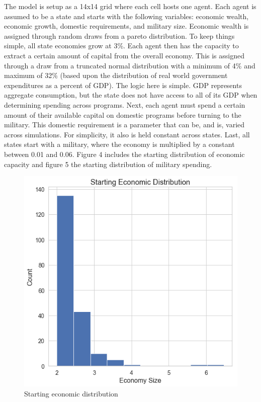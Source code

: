 \documentclass[12pt]{article}
\begin{document}
The model is setup as a 14x14 grid where each cell hosts one agent. Each agent is assumed to be a state and starts with the following variables: economic wealth, economic growth, domestic requirements, and military size. Economic wealth is assigned through random draws from a pareto distribution. To keep things simple, all state economies grow at 3\%. Each agent then has the capacity to extract a certain amount of capital from the overall economy. This is assigned through a draw from a truncated normal distribution with a minimum of 4\% and maximum of 32\% (based upon the distribution of real world government expenditures as a percent of GDP). The logic here is simple. GDP represents aggregate consumption, but the state does not have access to all of its GDP when determining spending across programs. Next, each agent must spend a certain amount of their available capital on domestic programs before turning to the military. This domestic requirement is a parameter that can be, and is, varied across simulations. For simplicity, it also is held constant across states. Last, all states start with a military, where the economy is multiplied by a constant between 0.01 and 0.06. Figure 4 includes the starting distribution of economic capacity and figure 5 the starting distribution of military spending.

\begin{figure}
    \centering
    \includegraphics[scale = 0.55]{images/start_hist.png}
    \caption{Starting economic distribution}
    \label{starthist}
\end{figure}
\end{document}
